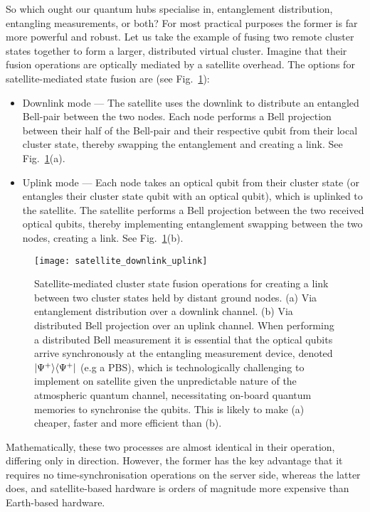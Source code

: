 So which ought our quantum hubs specialise in, entanglement distribution, entangling measurements, or both? For most practical purposes the former is far more powerful and robust. Let us take the example of fusing two remote cluster states together to form a larger, distributed virtual cluster. Imagine that their fusion operations are optically mediated by a satellite overhead. The options for satellite-mediated state fusion are (see Fig.~\ref{fig:sat_up_down}):
\begin{itemize}
	\item Downlink mode --- The satellite uses the downlink to distribute an entangled Bell-pair between the two nodes. Each node performs a Bell projection between their half of the Bell-pair and their respective qubit from their local cluster state, thereby swapping the entanglement and creating a link. See Fig.~\ref{fig:sat_up_down}(a).
	\item Uplink mode --- Each node takes an optical qubit from their cluster state (or entangles their cluster state qubit with an optical qubit), which is uplinked to the satellite. The satellite performs a Bell projection between the two received optical qubits, thereby implementing entanglement swapping between the two nodes, creating a link. See Fig.~\ref{fig:sat_up_down}(b).
\end{itemize}

\begin{figure}[!htb]
	\texttt{[image: satellite\_downlink\_uplink]}
	\caption{Satellite-mediated cluster state fusion operations for creating a link between two cluster states held by distant ground nodes. (a) Via entanglement distribution over a downlink channel. (b) Via distributed Bell projection over an uplink channel. When performing a distributed Bell measurement it is essential that the optical qubits arrive synchronously at the entangling measurement device, denoted \mbox{$|\Psi^+\rangle\langle\Psi^+|$} (e.g a PBS), which is technologically challenging to implement on satellite given the unpredictable nature of the atmospheric quantum channel, necessitating on-board quantum memories to synchronise the qubits. This is likely to make (a) cheaper, faster and more efficient than (b).} \label{fig:sat_up_down}
\end{figure}

Mathematically, these two processes are almost identical in their operation, differing only in direction. However, the former has the key advantage that it requires no time-synchronisation operations on the server side, whereas the latter does, and satellite-based hardware is orders of magnitude more expensive than Earth-based hardware.

